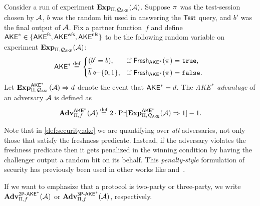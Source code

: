 

\begin{definition}\label{def:security:ake}

Consider a run of experiment $\mathbf{Exp}_{\mathrm{\Pi},\mathcal{Q}_{\mathsf{AKE}}}^{}(\mathcal{A})$.
Suppose $\oracle$ was the test-session chosen by $\mathcal{A}$,
$b$ was the random bit used in answering the $\mathsf{Test}$ query,
and $b'$ was the final output of $\mathcal{A}$.
Fix a partner function~$f$
and define $\mathsf{AKE}^* \in \lbrace \mathsf{AKE}^{\mathsf{fs}}, \allowbreak \mathsf{AKE}^{\mathsf{wfs}}, \allowbreak  \mathsf{AKE}^{\mathsf{nfs}} \rbrace$ 
to be the following random variable on experiment $\mathbf{Exp}_{\mathrm{\Pi},\mathcal{Q}_{\mathsf{AKE}}}(\mathcal{A})$:
\begin{equation}
	\ake^* \defeq
		\begin{dcases*}
			(b' = b), & if $\fresh_{\ake^*}(\oracle) = \TRUE$, \\
			\widetilde{b} \getsr \bits, & if $\fresh_{\ake^*}(\oracle) = \FALSE$.
		\end{dcases*}
\end{equation}
Let $\mathbf{Exp}_{\mathrm{\Pi},\mathcal{Q}_{\mathsf{AKE}}}^{\mathsf{AKE}^*}(\mathcal{A}) \Rightarrow d$ denote the event that $\mathsf{AKE}^* = d$.
The \emph{AKE$^{\,*}$ advantage} of an adversary $\mathcal{A}$ is defined as
\begin{equation}
	\mathbf{Adv}_{\mathrm{\Pi},f}^{\mathsf{AKE}^*}(\mathcal{A}) \overset{\mathrm{def}}{=}  2\cdot \Pr[\mathbf{Exp}_{\mathrm{\Pi},\mathcal{Q}_{\mathsf{AKE}}}^{\mathsf{AKE}^*}(\mathcal{A}) \Rightarrow 1] - 1 .
\end{equation} 
\end{definition}
\smallskip




Note that in \cref{def:security:ake} we are quantifying over \emph{all} adversaries,
not only those that satisfy the freshness predicate.
Instead,
if the adversary violates the freshness predicate then it gets penalized in the winning condition by having the challenger output a random bit on its behalf.   
This \emph{penalty-style} formulation of security has previously been used in other works like \cite{JC:BelHofKil15} and~\cite{EPRINT:GeoRac13}.



If we want to emphasize that a protocol is two-party or three-party,
we write $\mathbf{Adv}_{\mathrm{\Pi},f}^{\operatorname{\mathsf{2P-AKE}}^*}(\mathcal{A})$
or $\mathbf{Adv}_{\mathrm{\Pi},f}^{\operatorname{\mathsf{3P-AKE}}^*}(\mathcal{A})$,
respectively.





